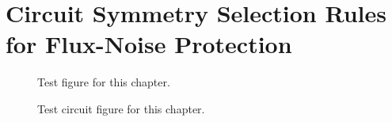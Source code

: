 \chapter{Circuit Symmetry Selection Rules for Flux-Noise Protection}\label{chp:rotor_codes}
\begin{figure}[htbp]
    \centering
    
    \caption{Test figure for this chapter.}
\end{figure}
\begin{figure}[htbp]
    \centering
    
    \caption{Test circuit figure for this chapter.}
\end{figure}

